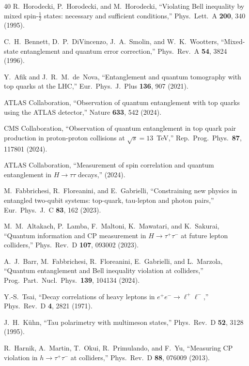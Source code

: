 \documentclass[prl,twocolumn,superscriptaddress,floatfix]{revtex4-2}
\begin{document}
\begin{thebibliography}{40}
  R.~Horodecki, P.~Horodecki, and M.~Horodecki,
  ``Violating Bell inequality by mixed spin-$\tfrac{1}{2}$ states:
  necessary and sufficient conditions,''
  Phys.\ Lett.\ A \textbf{200}, 340 (1995).

  C.~H.~Bennett, D.~P.~DiVincenzo, J.~A.~Smolin, and W.~K.~Wootters,
  ``Mixed-state entanglement and quantum error correction,''
  Phys.\ Rev.\ A \textbf{54}, 3824 (1996).

  Y.~Afik and J.~R.~M.~de~Nova,
  ``Entanglement and quantum tomography with top quarks at the LHC,''
  Eur.\ Phys.\ J.\ Plus \textbf{136}, 907 (2021).

  ATLAS Collaboration,
  ``Observation of quantum entanglement with top quarks
  using the ATLAS detector,''
  Nature \textbf{633}, 542 (2024).

  CMS Collaboration,
  ``Observation of quantum entanglement in top quark pair production
  in proton-proton collisions at $\sqrt{s}=13$~TeV,''
  Rep.\ Prog.\ Phys.\ \textbf{87}, 117801 (2024).

  ATLAS Collaboration,
  ``Measurement of spin correlation and quantum entanglement
  in $H\to\tau\tau$ decays,''
  (2024).

  M.~Fabbrichesi, R.~Floreanini, and E.~Gabrielli,
  ``Constraining new physics in entangled two-qubit systems:
  top-quark, tau-lepton and photon pairs,''
  Eur.\ Phys.\ J.\ C \textbf{83}, 162 (2023).

  M.~M.~Altakach, P.~Lamba, F.~Maltoni, K.~Mawatari, and K.~Sakurai,
  ``Quantum information and CP measurement in $H\to\tau^+\tau^-$
  at future lepton colliders,''
  Phys.\ Rev.\ D \textbf{107}, 093002 (2023).

  A.~J.~Barr, M.~Fabbrichesi, R.~Floreanini, E.~Gabrielli,
  and L.~Marzola,
  ``Quantum entanglement and Bell inequality violation at colliders,''
  Prog.\ Part.\ Nucl.\ Phys.\ \textbf{139}, 104134 (2024).

  Y.-S.~Tsai,
  ``Decay correlations of heavy leptons in
  $e^+e^-\to\ell^+\ell^-$,''
  Phys.\ Rev.\ D \textbf{4}, 2821 (1971).

  J.~H.~K\"uhn,
  ``Tau polarimetry with multimeson states,''
  Phys.\ Rev.\ D \textbf{52}, 3128 (1995).

  R.~Harnik, A.~Martin, T.~Okui, R.~Primulando, and F.~Yu,
  ``Measuring CP violation in $h\to\tau^+\tau^-$ at colliders,''
  Phys.\ Rev.\ D \textbf{88}, 076009 (2013).


\end{thebibliography}
\end{document}
